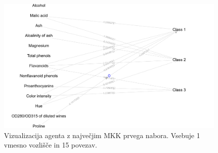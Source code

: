 \begin{figure}[H]
    \begin{center}
        \includegraphics[width=13cm]{wine/1/mcc_g}
    \end{center}
    \caption{Vizualizacija agenta z največjim MKK prvega nabora. Vsebuje 1 vmesno vozlišče in 15 povezav.}
    \label{fig:wine_mcc_1_g}
\end{figure}

\newpage

